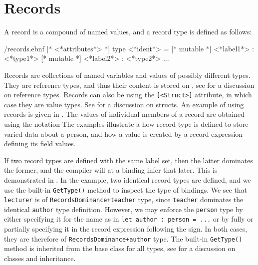\section{Records}
\label{sec:records}
A record is a compound of named values, and a record type is defined as follows:
%
\begin{verbatimwrite}{\ebnf/records.ebnf}
[* <*attributes*> *] 
type <*ident*> = {
  [* mutable *] <*label1*> : <*type1*>
  [* mutable *] <*label2*> : <*type2*>
  ...
}
\end{verbatimwrite}
%
Records are collections of named variables and values of possibly different types. They are reference types, and thus their content is stored on , see  for a discussion on reference types. Records can also be  using the \lstinline{[<Struct>]} attribute, in which case they are value types. See  for a discussion on structs. An example of using records is given in . The values of individual members of a record are obtained using the  notation
%
%
The examples illustrate a how record type is defined to store varied data about a person, and how a value is created by a record expression defining its field values.

If two record types are defined with the same label set, then the latter dominates the former, and the compiler will at a binding infer that later. This is demonstrated in .
%
%
In the example, two identical record types are defined, and we use the built-in \lstinline{GetType()} method to inspect the type of bindings. We see that \lstinline{lecturer} is of \lstinline{RecordsDominance+teacher} type, since \lstinline{teacher} dominates the identical \lstinline{author} type definition. However, we may enforce the \lstinline{person} type by either specifying it for the name as in \lstinline{let author : person = ...} or by fully or partially specifying it in the record expression following the \lexeme{=} sign. In both cases, they are therefore of \lstinline{RecordsDominance+author} type. The built-in \lstinline{GetType()} method is inherited from the base class for all types, see  for a discussion on classes and inheritance.

